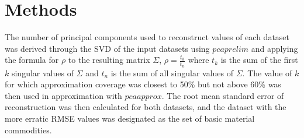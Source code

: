 \documentclass{article}
\begin{document}
	\section*{Methods}
	The number of principal components used to reconstruct values of each dataset was derived through the SVD of the input datasets using $pcaprelim$ and applying the formula for $\rho$ to the resulting matrix $\Sigma$, $\rho = \frac{t_k}{t_n}$ where $t_k$ is the sum of the first $k$ singular values of $\Sigma$ and $t_n$ is the sum of all singular values of $\Sigma$. The value of $k$ for which approximation coverage was closest to 50\% but not above 60\% was then used in approximation with $pcaapprox$. The root mean standard error of reconstruction was then calculated for both datasets, and the dataset with the more erratic RMSE values was designated as the set of basic material commodities.
	
\end{document}

